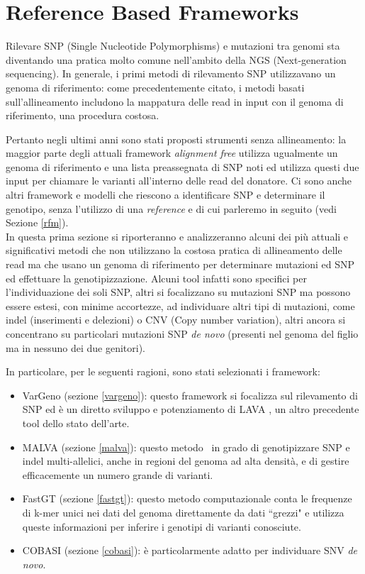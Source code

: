 \documentclass[../main.tex]{subfiles}
\begin{document}
\section{Reference Based Frameworks}
\label{rbm}

Rilevare SNP (Single Nucleotide Polymorphisms) e mutazioni tra genomi sta diventando una pratica molto comune nell'ambito della NGS (Next-generation sequencing). In generale, i primi metodi di rilevamento SNP utilizzavano un genoma di riferimento: come precedentemente citato, i metodi basati sull'allineamento includono la mappatura delle read in input con il genoma di riferimento, una procedura costosa. 

Pertanto negli ultimi anni sono stati proposti strumenti senza allineamento: la maggior parte degli attuali framework \textit{alignment free} utilizza ugualmente un genoma di riferimento e una lista preassegnata di SNP noti ed utilizza questi due input per chiamare le varianti all'interno delle read del donatore. Ci sono anche altri framework e modelli che riescono a identificare SNP e determinare il genotipo, senza l'utilizzo di una \textit{reference} e di cui parleremo in seguito (vedi Sezione \ref{rfm}). \\

In questa prima sezione si riporteranno e analizzeranno alcuni dei pi\`u attuali e significativi metodi che non utilizzano la costosa pratica di allineamento delle read ma che usano un genoma di riferimento per determinare mutazioni ed SNP ed effettuare la genotipizzazione. Alcuni tool infatti sono specifici per l'individuazione dei soli SNP, altri si focalizzano su mutazioni SNP ma possono essere estesi, con minime accortezze, ad individuare altri tipi di mutazioni, come indel (inserimenti e delezioni) o CNV (Copy number variation), altri ancora si concentrano su particolari mutazioni SNP \textit{de novo} (presenti nel genoma del figlio ma in nessuno dei due genitori).

In particolare, per le seguenti ragioni, sono stati selezionati i framework:
\begin{itemize} 
\item VarGeno (sezione \ref{vargeno}): questo framework \cite{sun-medvedev2018vargeno} si focalizza sul rilevamento di SNP ed \`e un diretto sviluppo e potenziamento di LAVA \cite{shajii2016lava}, un altro precedente tool dello stato dell'arte.
\item MALVA (sezione \ref{malva}): questo metodo \cite{bernardini2019malva} \ in grado di genotipizzare SNP e indel multi-allelici, anche in regioni del genoma ad alta densit\`a, e di gestire efficacemente un numero grande di varianti.
\item FastGT (sezione \ref{fastgt}): questo metodo computazionale \cite{pajuste2017fastgt} conta le frequenze di k-mer unici nei dati del genoma direttamente da dati ``grezzi" e utilizza queste informazioni per inferire i genotipi di varianti conosciute. 
\item COBASI (sezione \ref{cobasi}): \cite{gomez-romero2018cobasi} \`e particolarmente adatto per individuare SNV \textit{de novo}. 
\end{itemize} 
\end{document}
